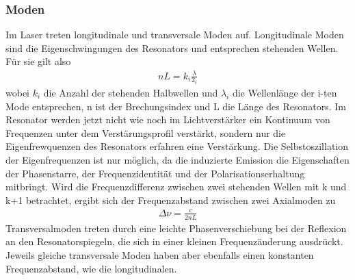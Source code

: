 \documentclass[a4paper,twoside,final]{article}
\begin{document}
\subsubsection{Moden}
Im Laser treten longitudinale und transversale Moden  auf. Longitudinale Moden sind die Eigenschwingungen des Resonators und entsprechen stehenden Wellen. Für sie gilt also
\begin{align}
  n L = k_i \frac{\lambda}{2_i}
\end{align}
wobei $ k_i$ die Anzahl der stehenden Halbwellen und $\lambda_i$ die Wellenlänge der i-ten Mode entsprechen, n ist der Brechungsindex und L die Länge des Resonators. Im Resonator werden jetzt nicht wie noch im Lichtverstärker ein Kontinuum von Frequenzen unter dem Verstärungsprofil verstärkt, sondern nur die Eigenfrewquenzen des Resonators erfahren eine Verstärkung. Die Selbstoszillation der Eigenfrequenzen ist nur möglich, da die induzierte Emission die Eigenschaften der Phasenstarre, der Frequenzidentität und der Polarisationserhaltung mitbringt. Wird die Frequenzdifferenz zwischen zwei stehenden Wellen mit k und k+1 betrachtet, ergibt sich der Frequenzabstand zwischen zwei Axialmoden zu
\begin{align}
  \Delta \nu = \frac{c}{2nL}
\end{align}
Transversalmoden treten durch eine leichte Phasenverschiebung bei der Reflexion an den Resonatorspiegeln, die sich in einer kleinen Frequenzänderung ausdrückt. Jeweils gleiche transversale Moden haben aber ebenfalls einen konstanten Frequenzabstand, wie die longitudinalen.
\end{document}
